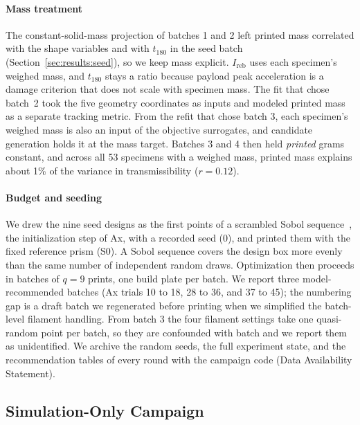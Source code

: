 \documentclass[lineno,nocopyright,upint,varvw,hyphenate]{asmejour}
\begin{document}
\paragraph{Mass treatment} The constant-solid-mass projection of batches
1 and 2 left printed mass correlated with the shape variables and with
$t_{180}$ in the seed batch (Section~\ref{sec:results:seed}), so we keep
mass explicit. $I_{\mathrm{reb}}$ uses each specimen's weighed mass, and
$t_{180}$ stays a ratio because payload peak acceleration is a damage
criterion that does not scale with specimen mass. The fit that chose
batch~2 took the five geometry coordinates as inputs and modeled printed
mass as a separate tracking metric. From the refit that chose batch 3,
each specimen's weighed mass is also an input of the objective
surrogates, and candidate generation holds it at the mass target.
Batches 3 and 4 then held \emph{printed} grams constant, and across all
53 specimens with a weighed mass, printed mass explains about 1\% of the variance in
transmissibility ($r = 0.12$).

\paragraph{Budget and seeding} We drew the nine seed designs as the
first points of a scrambled Sobol sequence~\citep{sobol1967distribution,
owen1998scrambling}, the initialization step of Ax, with a recorded seed
(0), and printed them with the fixed reference prism (S0). A Sobol
sequence covers the design box more evenly than the same number of
independent random draws. Optimization then proceeds in batches of
$q = 9$ prints, one build plate per batch. We report three
model-recommended batches (Ax trials 10 to 18, 28 to 36, and 37 to 45);
the numbering gap is a draft batch we regenerated before printing when
we simplified the batch-level filament handling. From batch 3 the four
filament settings take one quasi-random point per batch, so they are
confounded with batch and we report them as unidentified. We archive
the random seeds, the full experiment state, and the recommendation
tables of every round with the campaign code (Data Availability
Statement).

\subsection{Simulation-Only Campaign}
\label{sec:methods:sim}
\end{document}
